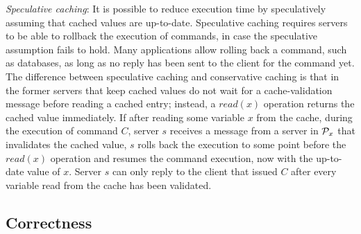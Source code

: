 \emph{Speculative caching}: It is possible to reduce execution time by speculatively assuming that cached values are up-to-date. 
Speculative caching requires servers to be able to rollback the execution of commands, in case the speculative assumption fails to hold. 
Many applications allow rolling back a command, such as databases, as long as no reply has been sent to the client for the command yet. 
The difference between speculative caching and conservative caching is that in the former servers that keep cached values do not wait for a cache-validation message before reading a cached entry; instead, a $read(x)$ operation returns the cached value immediately. 
If after reading some variable $x$ from the cache, during the execution of command $C$, server $s$ receives a message from a server in $\mathcal{P}_x$ that invalidates the cached value, $s$ rolls back the execution to some point before the $read(x)$ operation and resumes the command execution, now with the up-to-date value of $x$. 
Server $s$ can only reply to the client that issued $C$ after every variable read from the cache has been validated.


\subsection{Correctness}
\label{sec:correctness}

